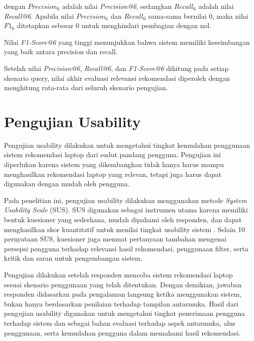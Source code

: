 \noindent dengan $Precision_{6}$ adalah nilai \textit{Precision@6}, sedangkan $Recall_{6}$ adalah nilai \textit{Recall@6}. Apabila nilai $Precision_{6}$ dan $Recall_{6}$ sama-sama bernilai 0, maka nilai $F1_{6}$ ditetapkan sebesar 0 untuk menghindari pembagian dengan nol.

Nilai \textit{F1-Score@6} yang tinggi menunjukkan bahwa sistem memiliki keseimbangan yang baik antara precision dan recall.

Setelah nilai \textit{Precision@6}, \textit{Recall@6}, dan \textit{F1-Score@6} dihitung pada setiap skenario query, nilai akhir evaluasi relevansi rekomendasi diperoleh dengan menghitung rata-rata dari seluruh skenario pengujian.

\section{Pengujian Usability}
Pengujian usability dilakukan untuk mengetahui tingkat kemudahan penggunaan sistem rekomendasi laptop dari sudut pandang pengguna. Pengujian ini diperlukan karena sistem yang dikembangkan tidak hanya harus mampu menghasilkan rekomendasi laptop yang relevan, tetapi juga harus dapat digunakan dengan mudah oleh pengguna.

Pada penelitian ini, pengujian usability dilakukan menggunakan metode \textit{System Usability Scale} (SUS). SUS digunakan sebagai instrumen utama karena memiliki bentuk kuesioner yang sederhana, mudah dipahami oleh responden, dan dapat menghasilkan skor kuantitatif untuk menilai tingkat usability sistem \cite{brooke1996sus}. Selain 10 pernyataan SUS, kuesioner juga memuat pertanyaan tambahan mengenai persepsi pengguna terhadap relevansi hasil rekomendasi, penggunaan filter, serta kritik dan saran untuk pengembangan sistem.

Pengujian dilakukan setelah responden mencoba sistem rekomendasi laptop sesuai skenario penggunaan yang telah ditentukan. Dengan demikian, jawaban responden didasarkan pada pengalaman langsung ketika menggunakan sistem, bukan hanya berdasarkan penilaian terhadap tampilan antarmuka. Hasil dari pengujian usability digunakan untuk mengetahui tingkat penerimaan pengguna terhadap sistem dan sebagai bahan evaluasi terhadap aspek antarmuka, alur penggunaan, serta kemudahan pengguna dalam memahami hasil rekomendasi.

